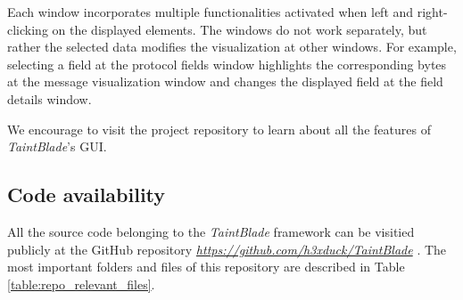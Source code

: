 \documentclass[conference]{IEEEtran}
\begin{document}
Each window incorporates multiple functionalities activated when left and
right-clicking on the displayed elements. The windows do not work separately,
but rather the selected data modifies the visualization at other windows. For
example, selecting a field at the protocol fields window highlights the
corresponding bytes at the message visualization window and changes the
displayed field at the field details window.

We encourage to visit the project repository\cite{taintblade_github_repo} to learn about all the features of
\textit{TaintBlade}'s GUI.

\subsection{Code availability}
All the source code belonging to the \textit{TaintBlade} framework can be
visitied publicly at the GitHub repository
\textit{\url{https://github.com/h3xduck/TaintBlade}}
\cite{taintblade_github_repo}. The most important folders and files of this
repository are described in Table \ref{table:repo_relevant_files}.
\end{document}
